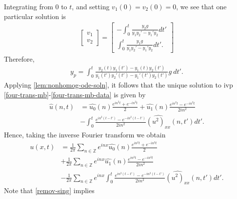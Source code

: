 \documentclass[12pt,reqno]{amsart}
\numberwithin{equation}{section}  %
\newcommand{\zz}{\mathbb{Z}}
\newcommand{\wh}{\widehat}
\begin{document}
Integrating from $0$ to $t$, and setting $v_{1}(0) = v_{2}(0) = 0$, we see that
one particular solution is
%
%
\begin{equation*}
\begin{split}
\begin{bmatrix}
  v_{1}
  \\
  v_{2}
\end{bmatrix}=
\begin{bmatrix}
 -\int_{0}^{t} \frac{y_{2}g}{y_{1}y_{2}' - y_{1}' y_{2}} dt' \\
  \int_{0}^{t}\frac{y_{1}g}{y_{1}y_{2}' - y_{1}' y_{2}}dt'.
\end{bmatrix}
\end{split}
\end{equation*}
Therefore,
%
%
\begin{equation*}
\begin{split}
  y_{p} =  \int_{0}^{t}
  \frac{ y_{2}(t)y_{1}(t') - y_{1}(t)y_{2}(t')}{y_{1}(t')y_{2}'(t') -
  y_{1}'(t') y_{2}(t')}g \ dt'.
\end{split}
\end{equation*}
%
%
%
%
%
Applying \cref{lem:nonhomog-ode-soln}, it follows that 
the unique solution to ivp
\eqref{four-trans-mb}-\eqref{four-trans-mb-data} is given by
%
%
\begin{equation*}
\begin{split}
\wh{u}(n, t)
& = \wh{u_{0}}(n) \frac{e^{in^{2}t} + e^{-in^{2}t}}{2} +
  \wh{u_{1}}(n)\frac{e^{in^{2}t} - e^{-in^{2}t}}{2 i n^{2}}
  \\
  & -
  \int_{0}^{t}\frac{e^{in^{2}(t-t')}-e^{-in^{2}(t-t')}}{2in^{2}}
  \wh{(u^{2})_{xx}}(n, t') dt'.
\end{split}
\end{equation*}
%
Hence, taking the inverse Fourier transform we obtain
%
\begin{equation}
  \begin{split}
    u(x,t)
    & = \frac{1}{2\pi}\sum_{n \in \zz} e^{inx} \wh{u_{0}}(n) \frac{e^{in^{2}t} + e^{-in^{2}t}}{2} 
    \\
    & + \frac{1}{2 \pi}\sum_{n \in \zz} e^{inx}
    \wh{u_{1}}(n)\frac{e^{in^{2}t} - e^{-in^{2}t}}{2 i n^{2}} 
    \\
    & - \frac{1}{2 \pi}\sum_{n \in \zz} e^{inx}
    \int_{0}^{t}\frac{e^{in^{2}(t-t')}-e^{-in^{2}(t-t')}}{2 i n^{2}}
    \wh{(u^{2})_{xx}}(n, t') dt'.
  \end{split}
  \label{eqn:pre-integral-form}
\end{equation}
%
Note that \eqref{remov-sing} implies
\end{document}
